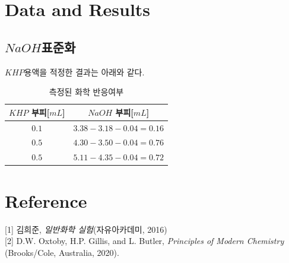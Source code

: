 \documentclass[%
 reprint,
 amsmath,amssymb,
 aps,
]{revtex4-2}
\begin{document}
\section{\label{sec:level1}Data and Results}
\subsection{\label{sec:level2}$NaOH$표준화}
$KHP$용액을 적정한 결과는 아래와 같다.
\begin{table}[]
\begin{tabular}{c|c} \hline \hline
$KHP$ 부피[$mL$] & $NaOH$ 부피[$mL$] \\ \hline
$0.1$ & $3.38 - 3.18 - 0.04 = 0.16$  \\ \hline
$0.5$ & $4.30 - 3.50 - 0.04 = 0.76$  \\ \hline
$0.5$ & $5.11-4.35 - 0.04 = 0.72$ \\  \hline \hline 
\end{tabular}
\caption{\label{tab:chemreaction}측정된 화학 반응여부}
\end{table}

\section{\label{sec:level1}Reference}
[1] 김희준, \textit{일반화학 실험}(자유아카데미, 2016)\\

[2] D.W. Oxtoby, H.P. Gillis, and L. Butler, \textit{Principles of Modern Chemistry} (Brooks/Cole, Australia, 2020).
\end{document}

